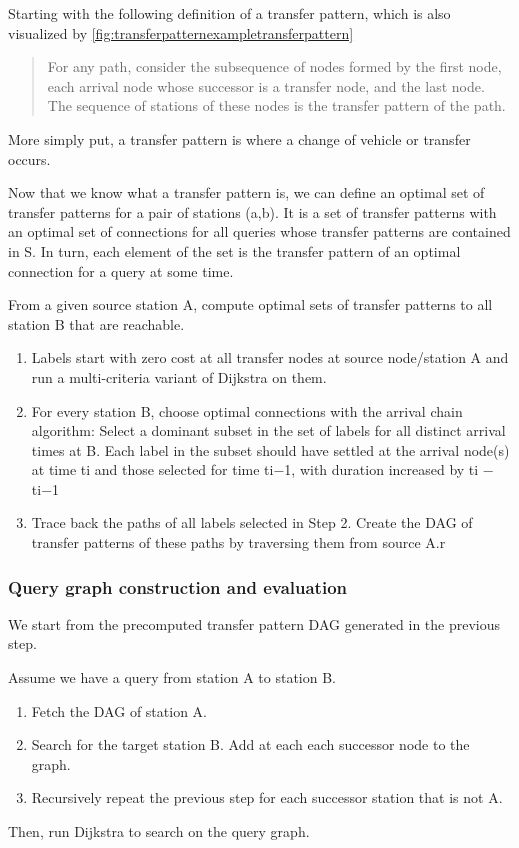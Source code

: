  Starting with the following definition\cite{bast_fast_2010} of a transfer pattern, which is also visualized by \autoref{fig:transferpatternexampletransferpattern}
\begin{quote}
    For any path, consider the subsequence of nodes formed by the first node, each arrival node whose successor is a transfer node, and the last node. The sequence of stations of these nodes is the transfer pattern of the path.
\end{quote}

More simply put, a transfer pattern is where a change of vehicle or transfer occurs. 

Now that we know what a transfer pattern is, we can define an optimal set of transfer patterns for a pair of stations (a,b). It is a set of transfer patterns with an optimal set of connections for all queries whose transfer patterns are contained in S. In turn, each element of the set is the transfer pattern of an optimal connection for a query at some time. 

From a given source station A, compute optimal sets of transfer patterns to all station B that are reachable. 
\begin{enumerate}
    \item Labels start with zero cost at all transfer nodes at source node/station A and run a multi-criteria variant of Dijkstra on them.
    \item For every station B, choose optimal connections with the arrival chain algorithm: Select a dominant subset in the set of labels for all distinct arrival times at B. Each label in the subset should have settled at the arrival node(s) at time ti and those selected for time ti−1, with duration increased by ti − ti−1
    \item Trace back the paths of all labels selected in Step 2. Create the DAG of transfer patterns of these paths by traversing them from source A.r
\end{enumerate}
\subsubsection{Query graph construction and evaluation}
We start from the precomputed transfer pattern DAG generated in the previous step.

Assume we have a query from station A to station B.
\begin{enumerate}
    \item Fetch the DAG of station A.
    \item Search for the target station B. Add at each each successor node to the graph.
    \item Recursively repeat the previous step for each successor station that is not A.
\end{enumerate}
Then, run Dijkstra to search on the query graph.

